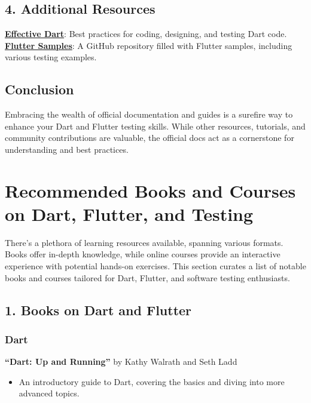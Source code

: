 \documentclass[
]{article}
\providecommand{\tightlist}{%
  \setlength{\itemsep}{0pt}\setlength{\parskip}{0pt}}
\begin{document}
\subsection{4. Additional Resources}\label{additional-resources}

\href{https://dart.dev/effective-dart}{\textbf{Effective Dart}}: Best
practices for coding, designing, and testing Dart code.
\href{https://github.com/flutter/samples}{\textbf{Flutter Samples}}: A
GitHub repository filled with Flutter samples, including various testing
examples.

\subsection{Conclusion}\label{conclusion-17}

Embracing the wealth of official documentation and guides is a surefire
way to enhance your Dart and Flutter testing skills. While other
resources, tutorials, and community contributions are valuable, the
official docs act as a cornerstone for understanding and best practices.

\section{Recommended Books and Courses on Dart, Flutter, and
Testing}\label{recommended-books-and-courses-on-dart-flutter-and-testing}

There's a plethora of learning resources available, spanning various
formats. Books offer in-depth knowledge, while online courses provide an
interactive experience with potential hands-on exercises. This section
curates a list of notable books and courses tailored for Dart, Flutter,
and software testing enthusiasts.

\subsection{1. Books on Dart and
Flutter}\label{books-on-dart-and-flutter}

\subsubsection{Dart}\label{dart}

\textbf{``Dart: Up and Running''} by Kathy Walrath and Seth Ladd

\begin{itemize}
\tightlist
\item
  An introductory guide to Dart, covering the basics and diving into
  more advanced topics.
\end{itemize}
\end{document}
